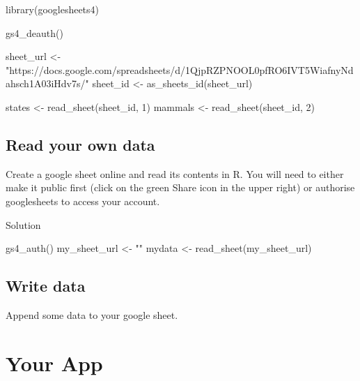 \documentclass[
  oneside]{book}
\newenvironment{Shaded}{\begin{snugshade}}{\end{snugshade}}
\newcommand{\DecValTok}[1]{\textcolor[rgb]{0.00,0.00,0.81}{#1}}
\newcommand{\FunctionTok}[1]{\textcolor[rgb]{0.00,0.00,0.00}{#1}}
\newcommand{\NormalTok}[1]{#1}
\newcommand{\OtherTok}[1]{\textcolor[rgb]{0.56,0.35,0.01}{#1}}
\newcommand{\StringTok}[1]{\textcolor[rgb]{0.31,0.60,0.02}{#1}}
\begin{document}
\begin{Shaded}
\begin{Highlighting}[]
\FunctionTok{library}\NormalTok{(googlesheets4)}

\FunctionTok{gs4\_deauth}\NormalTok{()}

\NormalTok{sheet\_url }\OtherTok{\textless{}{-}} \StringTok{"https://docs.google.com/spreadsheets/d/1QjpRZPNOOL0pfRO6IVT5WiafnyNdahsch1A03iHdv7s/"}
\NormalTok{sheet\_id }\OtherTok{\textless{}{-}} \FunctionTok{as\_sheets\_id}\NormalTok{(sheet\_url)}

\NormalTok{states }\OtherTok{\textless{}{-}} \FunctionTok{read\_sheet}\NormalTok{(sheet\_id, }\DecValTok{1}\NormalTok{)}
\NormalTok{mammals }\OtherTok{\textless{}{-}} \FunctionTok{read\_sheet}\NormalTok{(sheet\_id, }\DecValTok{2}\NormalTok{)}
\end{Highlighting}
\end{Shaded}

\hypertarget{read-your-own-data}{%
\subsection*{Read your own data}\label{read-your-own-data}}

Create a google sheet online and read its contents in R. You will need to either make it public first (click on the green Share icon in the upper right) or authorise googlesheets to access your account.

Solution

\begin{Shaded}
\begin{Highlighting}[]
\FunctionTok{gs4\_auth}\NormalTok{()}
\NormalTok{my\_sheet\_url }\OtherTok{\textless{}{-}} \StringTok{""}
\NormalTok{mydata }\OtherTok{\textless{}{-}} \FunctionTok{read\_sheet}\NormalTok{(my\_sheet\_url)}
\end{Highlighting}
\end{Shaded}

\hypertarget{write-data}{%
\subsection*{Write data}\label{write-data}}

Append some data to your google sheet.

\hypertarget{your-app-data}{%
\section{Your App}\label{your-app-data}}
\end{document}
